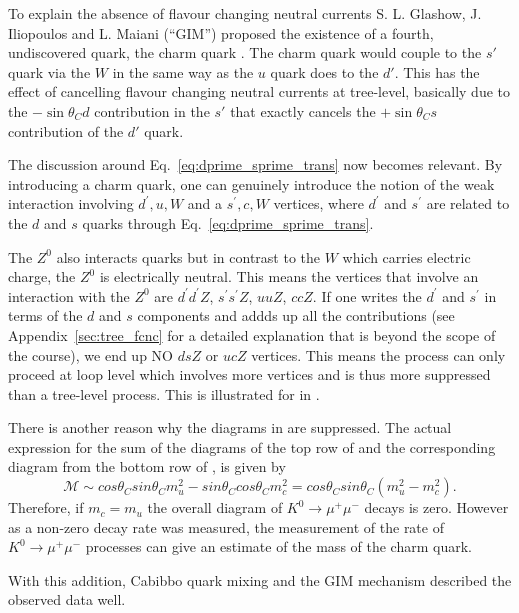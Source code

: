  To explain the absence of flavour changing neutral currents
 S. L. Glashow, J. Iliopoulos and L. Maiani (``GIM'') proposed the
 existence of a fourth, undiscovered quark, the charm quark
 \cite{physrev:gim}. The charm quark would couple to the $s'$ quark
 via the $W$ in the same way as the $u$ quark does to the $d'$.  This
 has the effect of cancelling flavour changing neutral
 currents at tree-level, basically due to the $-\sin\theta_C d$ contribution in the
 $s'$ that exactly cancels the $+\sin\theta_C s$ contribution of the
 $d'$ quark. 

 The discussion around Eq.~\ref{eq:dprime_sprime_trans} now becomes
 relevant. By introducing a charm quark, one can genuinely introduce
 the notion of the weak interaction involving $d^\prime, u, W$ and a
 $s^\prime, c, W$ vertices, where $d^\prime$ and $s^\prime$ are related
 to the $d$ and $s$ quarks through Eq.~\ref{eq:dprime_sprime_trans}.

 The $Z^0$ also interacts quarks but in contrast to the $W$ which
 carries electric charge, the $Z^0$ is electrically neutral. This
 means the vertices that involve an interaction with the $Z^0$ are
 $d^\prime d^\prime Z$, $s^\prime s^\prime Z$, $uuZ$, $ccZ$. If one writes
 the $d^\prime$ and $s^\prime$ in terms of the $d$ and $s$ components
 and addds up all the contributions (see Appendix~\ref{sec:tree_fcnc}
 for a detailed explanation that is beyond the scope of the course),
 we end up NO $dsZ$ or $ucZ$ vertices. This means the process  can only proceed at loop level which involves more
 vertices and is thus more suppressed than a tree-level process. This
 is illustrated for  in
 .

There is another reason why the diagrams in  are
suppressed. The actual expression for the sum of the diagrams of the
top row of  and the corresponding diagram from
the bottom row of , is given by
\[
\mathcal{M}\sim cos\theta_{C}sin\theta_{C}m_{u}^{2}-sin\theta_{C}cos\theta_{C}m_{c}^{2}=cos\theta_{C}sin\theta_{C}(m_{u}^{2}-m_{c}^{2}).
\]
Therefore, if $m_{c}=m_{u}$ the overall diagram of $K^0\to\mu^+\mu^-$ decays is zero. However as a non-zero decay rate was measured, the measurement of the rate of $K^0\to\mu^+\mu^-$ processes can give an estimate of the mass of the charm quark.

With this addition, Cabibbo quark mixing and the GIM mechanism described the observed data well.

